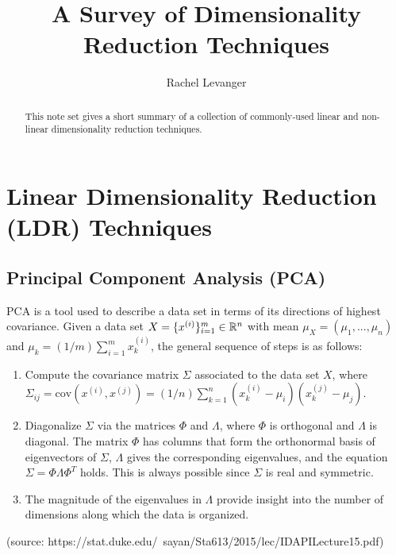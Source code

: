 \documentclass{gtpart}
\title{A Survey of Dimensionality Reduction Techniques}
\author{Rachel Levanger}
\theoremstyle{definition}
\begin{document}
\begin{abstract}    %

This note set gives a short summary of a collection of commonly-used linear and non-linear dimensionality reduction techniques.

\end{abstract}

\maketitle

\tableofcontents


\pagebreak 

\section{Linear Dimensionality Reduction (LDR) Techniques}

\subsection{Principal Component Analysis (PCA)} 

PCA is a tool used to describe a data set in terms of its directions of highest covariance. Given a data set $X = \{x^{(i)}\}_{i=1}^m \in \mathbb{R}^n$ with mean $\mu_X = (\mu_1, ..., \mu_n)$ and $\mu_k = (1/m)\sum_{i=1}^m x^{(i)}_k$, the general sequence of steps is as follows:
\begin{enumerate}[(1)]
\item Compute the covariance matrix $\Sigma$ associated to the data set $X$, where $\Sigma_{ij} = \text{cov}(x^{(i)}, x^{(j)}) =(1/n) \sum_{k=1}^n (x_k^{(i)} - \mu_i)(x_k^{(j)} - \mu_j).$
\item Diagonalize $\Sigma$ via the matrices $\Phi$ and $\Lambda$, where $\Phi$ is orthogonal and $\Lambda$ is diagonal. The matrix $\Phi$ has columns that form the orthonormal basis of eigenvectors of $\Sigma$, $\Lambda$ gives the corresponding eigenvalues, and the equation $\Sigma = \Phi \Lambda \Phi^T$ holds. This is always possible since $\Sigma$ is real and symmetric.
\item The magnitude of the eigenvalues in $\Lambda$ provide insight into the number of dimensions along which the data is organized.
\end{enumerate}



(source: https://stat.duke.edu/~sayan/Sta613/2015/lec/IDAPILecture15.pdf)
\end{document}
